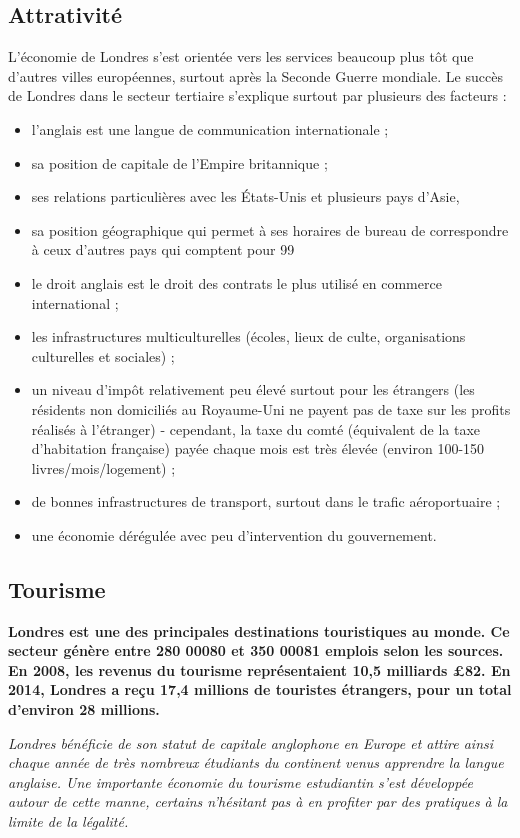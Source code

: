 \documentclass{article}
\begin{document}
\subsection{Attrativité}
L'économie de Londres s'est orientée vers les services beaucoup plus tôt que d'autres villes européennes, surtout après la Seconde Guerre mondiale. Le succès de Londres dans le secteur tertiaire s'explique surtout par plusieurs des facteurs :
\begin{itemize}
    \item l'anglais est une langue de communication internationale ;
    \item sa position de capitale de l'Empire britannique ;
    \item ses relations particulières avec les États-Unis et plusieurs pays d'Asie,
    \item sa position géographique qui permet à ses horaires de bureau de correspondre à ceux d'autres pays qui comptent pour 99 %
    \item le droit anglais est le droit des contrats le plus utilisé en commerce international ;
    \item les infrastructures multiculturelles (écoles, lieux de culte, organisations culturelles et sociales) ;
    \item un niveau d'impôt relativement peu élevé surtout pour les étrangers (les résidents non domiciliés au Royaume-Uni ne payent pas de taxe sur les profits réalisés à l'étranger) - cependant, la taxe du comté (équivalent de la taxe d'habitation française) payée chaque mois est très élevée (environ 100-150 livres/mois/logement) ;
    \item de bonnes infrastructures de transport, surtout dans le trafic aéroportuaire ;
    \item une économie dérégulée avec peu d'intervention du gouvernement.
\end{itemize}

\subsection{Tourisme}

\textbf{Londres est une des principales destinations touristiques au monde. Ce secteur génère entre 280 00080 et 350 00081 emplois selon les sources. En 2008, les revenus du tourisme représentaient 10,5 milliards £82. En 2014, Londres a reçu 17,4 millions de touristes étrangers, pour un total d'environ 28 millions.}

\textit{Londres bénéficie de son statut de capitale anglophone en Europe et attire ainsi chaque année de très nombreux étudiants du continent venus apprendre la langue anglaise. Une importante économie du tourisme estudiantin s'est développée autour de cette manne, certains n'hésitant pas à en profiter par des pratiques à la limite de la légalité.}
\end{document}
